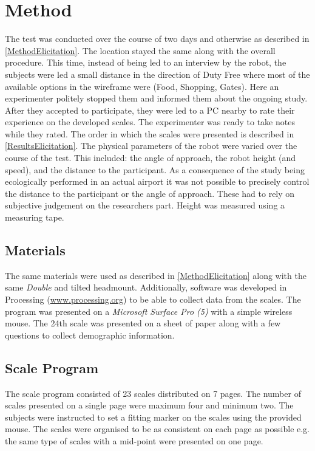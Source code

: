 \section{Method}
\label{Method2}
The test was conducted over the course of two days and otherwise as described in \autoref{MethodElicitation}. The location stayed the same along with the overall procedure. This time, instead of being led to an interview by the robot, the subjects were led a small distance in the direction of Duty Free where most of the available options in the wireframe were (Food, Shopping, Gates). Here an experimenter politely stopped them and informed them about the ongoing study. After they accepted to participate, they were led to a PC nearby to rate their experience on the developed scales. The experimenter was ready to take notes while they rated. The order in which the scales were presented is described in \autoref{ResultsElicitation}. The physical parameters of the robot were varied over the course of the test. This included: the angle of approach, the robot height (and speed), and the distance to the participant. As a consequence of the study being ecologically performed in an actual airport it was not possible to precisely control the distance to the participant or the angle of approach. These had to rely on subjective judgement on the researchers part. Height was measured using a measuring tape.

\subsection{Materials}
The same materials were used as described in \autoref{MethodElicitation} along with the same \textit{Double} and tilted headmount. Additionally, software was developed in Processing (\url{www.processing.org}) to be able to collect data from the scales. The program was presented on a \textit{Microsoft Surface Pro (5)} with a simple wireless mouse. The 24th scale was presented on a sheet of paper along with a few questions to collect demographic information.

\subsection{Scale Program}
The scale program consisted of 23 scales distributed on 7 pages. The number of scales presented on a single page were maximum four and minimum two. The subjects were instructed to set a fitting marker on the scales using the provided mouse. The scales were organised to be as consistent on each page as possible e.g. the same type of scales with a mid-point were presented on one page.

